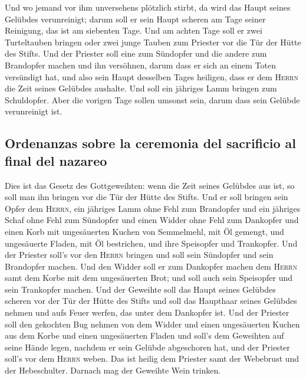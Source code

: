  Und wo jemand vor ihm unversehens plötzlich stirbt, da
wird das Haupt seines Gelübdes verunreinigt; darum soll er sein Haupt
scheren am Tage seiner Reinigung, das ist am siebenten Tage.
 Und am achten Tage soll er zwei Turteltauben bringen
oder zwei junge Tauben zum Priester vor die Tür der Hütte des Stifts.
 Und der Priester soll eine zum Sündopfer und die andere
zum Brandopfer machen und ihn versöhnen, darum dass er sich an einem
Toten versündigt hat, und also sein Haupt desselben Tages heiligen,
 dass er dem \textsc{Herrn} die Zeit seines Gelübdes
aushalte. Und soll ein jähriges Lamm bringen zum Schuldopfer. Aber die
vorigen Tage sollen umsonst sein, darum dass sein Gelübde verunreinigt
ist.

\hypertarget{ordenanzas-sobre-la-ceremonia-del-sacrificio-al-final-del-nazareo}{%
\subsection{Ordenanzas sobre la ceremonia del sacrificio al final del
nazareo}\label{ordenanzas-sobre-la-ceremonia-del-sacrificio-al-final-del-nazareo}}

 Dies ist das Gesetz des Gottgeweihten: wenn die Zeit
seines Gelübdes aus ist, so soll man ihn bringen vor die Tür der Hütte
des Stifts.  Und er soll bringen sein Opfer dem
\textsc{Herrn}, ein jähriges Lamm ohne Fehl zum Brandopfer und ein
jähriges Schaf ohne Fehl zum Sündopfer und einen Widder ohne Fehl zum
Dankopfer  und einen Korb mit ungesäuerten Kuchen von
Semmelmehl, mit Öl gemengt, und ungesäuerte Fladen, mit Öl bestrichen,
und ihre Speisopfer und Trankopfer.  Und der Priester
soll's vor den \textsc{Herrn} bringen und soll sein Sündopfer und sein
Brandopfer machen.  Und den Widder soll er zum Dankopfer
machen dem \textsc{Herrn} samt dem Korbe mit dem ungesäuerten Brot; und
soll auch sein Speisopfer und sein Trankopfer machen. 
Und der Geweihte soll das Haupt seines Gelübdes scheren vor der Tür der
Hütte des Stifts und soll das Haupthaar seines Gelübdes nehmen und aufs
Feuer werfen, das unter dem Dankopfer ist.  Und der
Priester soll den gekochten Bug nehmen von dem Widder und einen
ungesäuerten Kuchen aus dem Korbe und einen ungesäuerten Fladen und
soll's dem Geweihten auf seine Hände legen, nachdem er sein Gelübde
abgeschoren hat,  und der Priester soll's vor dem
\textsc{Herrn} weben. Das ist heilig dem Priester samt der Webebrust und
der Hebeschulter. Darnach mag der Geweihte Wein trinken.


